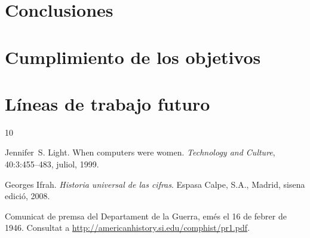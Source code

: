 \documentclass[11pt,spanish,listoffigures,listoftables]{tfgetsinf}
\begin{document}
\section{Conclusiones}

\section{Cumplimiento de los objetivos}

\section{Líneas de trabajo futuro}


\begin{thebibliography}{10}

   Jennifer~S. Light.
   \newblock When computers were women.
   \newblock \textit{Technology and Culture}, 40:3:455--483, juliol, 1999.

   Georges Ifrah.
   \newblock \textit{Historia universal de las cifras}.
   \newblock Espasa Calpe, S.A., Madrid, sisena edició, 2008.

   Comunicat de premsa del Departament de la Guerra, 
   emés el 16 de febrer de 1946. 
   \newblock Consultat a 
   \url{http://americanhistory.si.edu/comphist/pr1.pdf}.

\end{thebibliography}
\cleardoublepage

\end{document}
